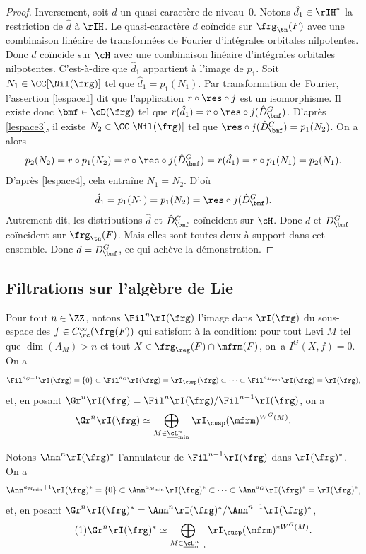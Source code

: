 \begin{proof}
Inversement, soit $d$ un quasi-caractère de niveau~$0$. Notons $\hat{d}_{1}\in \rIH^*$ la restriction de $\hat{d}$ à $\rIH$. Le quasi-caractère $d$ coïncide sur $\frg_{\tn}(F)$ avec une combinaison linéaire de transformées de Fourier d'intégrales orbitales nilpotentes. Donc $\hat{d}$ coïncide sur $\cH$ avec une combinaison linéaire d'intégrales orbitales nilpotentes. C'est-à-dire que $\hat{d}_{1}$ appartient à l'image de $p_{1}$. Soit $N_{1}\in \CC[\Nil(\frg)]$ tel que $\hat{d}_{1}=p_{1}(N_{1})$. Par transformation de~Fourier, l'assertion \eqref{lespace1} dit que l'application $r\circ \res\circ j$ est un isomorphisme. Il existe donc $\bmf\in \cD(\frg)$ tel que $r(\hat{d}_{1})=r\circ \res\circ j(\hat{D}^G_{\bmf})$. D'après \eqref{lespace3}, il existe $N_{2}\in \CC[\Nil(\frg)]$ tel que $\res\circ j(\hat{D}^G_{\bmf})=p_{1}(N_{2})$. On a alors
\[
p_{2}(N_{2})=r\circ p_{1}(N_{2})=r\circ \res\circ j(\hat{D}^G_{\bmf})=r(\hat{d}_{1})=r\circ p_{1}(N_{1})=p_{2}(N_{1}).
\]
D'après \eqref{lespace4}, cela entraîne $N_{1}=N_{2}$. D'où
\[
\hat{d}_{1}=p_{1}(N_{1})=p_{1}(N_{2})=\res\circ j(\hat{D}^G_{\bmf}).
\]
Autrement dit, les distributions $\hat{d}$ et $\hat{D}^G_{\bmf}$ coïncident sur $\cH$. Donc $d$ et $D^G_{\bmf}$ coïncident sur $\frg_{\tn}(F)$. Mais elles sont toutes deux à support dans cet ensemble. Donc $d=D^G_{\bmf}$, ce qui achève la démonstration.
\end{proof}

\subsection{Filtrations sur l'algèbre de Lie}\label{filtrationssurlalgebredelie}
Pour tout $n \in \ZZ$, notons $\Fil^n\rI(\frg)$ l'image dans $\rI(\frg)$ du sous-espace des $f\in C_{\rc}^{\infty}(\frg(F))$ qui satisfont à la condition: pour tout Levi $M$ tel que $\dim(A_{M})>n$ et tout $X\in \frg_{\reg}(F)\cap \mfrm(F)$, on~a $I^G(X,f)=0$. On a
\[
\Fil^{a_{G}-1}\rI(\frg)=\{0\}\subset \Fil^{a_{G}}\rI(\frg)=\rI_{\cusp}(\frg)\subset\cdots\subset \Fil^{a_{M_{\min}}}\rI(\frg)=\rI(\frg),
\]
et, en posant $\Gr^n\rI(\frg)=\Fil^n\rI(\frg)/\Fil^{n-1}\rI(\frg)$, on a
\[
\Gr^n\rI(\frg)\simeq \bigoplus_{M\in \underline{\cL}_{\min}^n}\rI_{\cusp}(\mfrm)^{W^G(M)}.
\]

Notons $\Ann^n\rI(\frg)^*$ l'annulateur de $\Fil^{n-1}\rI(\frg)$ dans $\rI(\frg)^*$. On a
\[
\Ann^{a_{M_{\min}}+1}\rI(\frg)^*=\{0\}\subset \Ann^{a_{M_{\min}}}\rI(\frg)^*\subset\cdots\subset \Ann^{a_{G}}\rI(\frg)^*=\rI(\frg)^*,
\]
et, en posant $\Gr^n\rI(\frg)^*=\Ann^n\rI(\frg)^*/\Ann^{n+1}\rI(\frg)^*$,
\begin{equation}\tag{1}\label{filtrationssurlalgebredelie1}
\Gr^n\rI(\frg)^*\simeq \bigoplus_{M\in \underline{\cL}_{\min}^n}\rI_{\cusp}(\mfrm)^{*W^G(M)}.
\end{equation}

